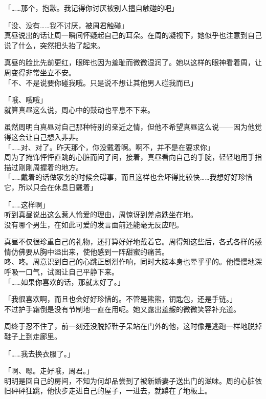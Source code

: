 「……那个，抱歉。我记得你讨厌被别人擅自触碰的吧」

「没、没有……我不讨厌，被周君触碰」\\

真昼说出的话让周一瞬间怀疑起自己的耳朵。在周的凝视下，她似乎也注意到自己说了什么，突然把头抬了起来。

真昼的脸比先前更红，眼眸也因为羞耻而微微湿润了。她以这样的眼神看着周，让周变得非常坐立不安。\\

「不、不是说要你碰我哦。只是说不想让其他男人碰我而已」

「哦、哦哦」\\

就算真昼这么说，周心中的鼓动也平息不下来。

虽然周明白真昼对自己那种特别的亲近之情，但他不希望真昼这么说——因为他觉得这会让自己想入非非。\\

「……对、对了。昨天那个，你没戴着啊。啊不，并不是在要求你」\\

周为了掩饰怦怦直跳的心脏而问了问，接着，真昼看向自己的手腕，轻轻地用手指描过刚刚周握着的地方。\\

「……戴着的话做家务的时候会碍事，而且这样也会坏得比较快……我想好好珍惜它，所以只会在休息日戴着」

「……这样啊」\\

听到真昼说出这么惹人怜爱的理由，周惊讶到差点跌坐在地。\\

没有哪个男生，在如此可爱的发言面前还能毫无反应吧。

真昼不仅很珍重自己的礼物，还打算好好地戴着它。周得知这些后，各式各样的感情仿佛要从胸中溢出来，使他感到一阵甜蜜的痛苦。\\

咚、咚。周意识到自己的心跳正剧烈作响，同时大脑本身也晕乎乎的。他慢慢地深呼吸一口气，试图让自己平静下来。\\

「……如果你喜欢的话，那就太好了。」

「我很喜欢啊，而且也会好好珍惜的。不管是熊熊，钥匙包，还是手链。」\\

不过护手霜倒是没有节制地一直在用呢。她又露出羞赧的微微笑容补充道。

周终于忍不住了，前一刻还没脱掉鞋子呆站在门外的他，这时像是逃跑一样地脱掉鞋子上到走廊里。

「……我去换衣服了。」

「啊、嗯。走好哦，周君。」\\

明明是回自己的房间，不知为何却品尝到了被新婚妻子送出门的滋味。周的心脏依旧砰砰狂跳，他快步走进自己的屋子，一进去，就蹲在了地板上。


